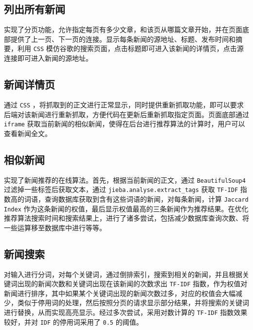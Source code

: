 \documentclass[11pt]{article}
\begin{document}
\subsection{列出所有新闻}
\label{sec:orgb3a681f}
实现了分页功能，允许指定每页有多少文章，和该页从哪篇文章开始，并在页面底部提供了上一页、下一页的连接。显示每条新闻的源地址、标题、发布时间和摘要，利用 \texttt{CSS} 模仿谷歌的搜索页面，点击标题即可进入该新闻的详情页，点击源连接即可进入新闻的源地址。
\subsection{新闻详情页}
\label{sec:org47e69e5}
通过 \texttt{CSS} ，将抓取到的正文进行正常显示，同时提供重新抓取功能，即可以要求后端对该新闻进行重新抓取，方便代码在更新后重新抓取指定页面。页面底部通过 \texttt{iframe} 获取当前新闻的相似新闻，使得在后台进行推荐算法的计算时，用户可以查看新闻全文。
\subsection{相似新闻}
\label{sec:org5e6d0ce}
实现了新闻推荐的在线算法。首先，根据当前新闻的正文，通过 \texttt{BeautifulSoup4} 过滤掉一些标签后获取文本，通过 \texttt{jieba.analyse.extract\_tags} 获取 \texttt{TF-IDF} 指数高的词语，查询数据库获取到含有这些词语的新闻，对每条新闻，计算 \texttt{Jaccard Index} 作为这条新闻的权值，最后显示权值最高的三条新闻作为推荐结果。在优化推荐算法搜索时间和搜索结果上，进行了诸多尝试，包括减少数据库查询次数、将一些运算移至数据库中进行等等。
\subsection{新闻搜索}
\label{sec:org51109ae}
对输入进行分词，对每个关键词，通过倒排索引，搜索到相关的新闻，并且根据关键词出现的新闻次数和关键词出现在该新闻的次数求出 \texttt{TF-IDF} 指数，作为权值对新闻进行排序，其中如果某个关键词出现的新闻次数过多，对应的权值会大幅减少，类似于停用词的处理，然后按照分页的请求显示部分结果，并将搜索的关键词进行替换，从而实现高亮显示。经过多次尝试，采用对数计算的 \texttt{TF-IDF} 指数效果较好，并对 \texttt{IDF} 的停用词采用了 \texttt{0.5} 的阈值。
\end{document}
